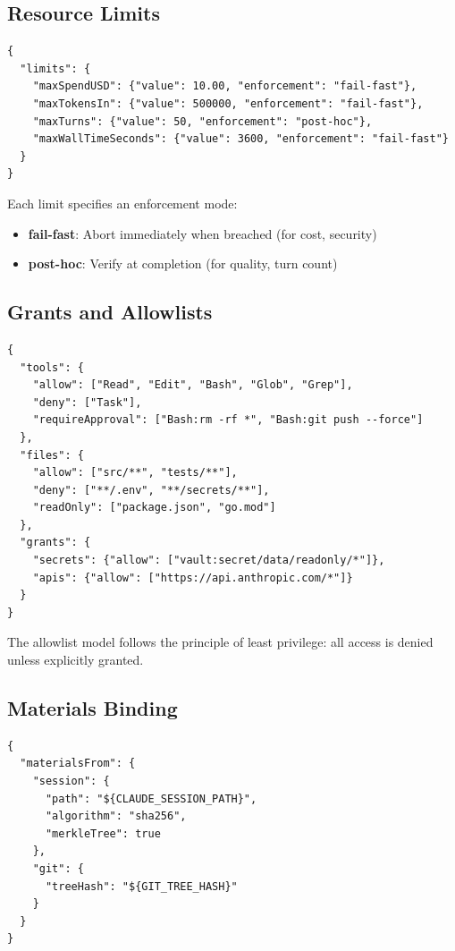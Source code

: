 \documentclass[11pt,a4paper]{article}
\begin{document}
\subsection{Resource Limits}

\begin{lstlisting}[style=json]
{
  "limits": {
    "maxSpendUSD": {"value": 10.00, "enforcement": "fail-fast"},
    "maxTokensIn": {"value": 500000, "enforcement": "fail-fast"},
    "maxTurns": {"value": 50, "enforcement": "post-hoc"},
    "maxWallTimeSeconds": {"value": 3600, "enforcement": "fail-fast"}
  }
}
\end{lstlisting}

Each limit specifies an enforcement mode:
\begin{itemize}[noitemsep]
    \item \textbf{fail-fast}: Abort immediately when breached (for cost, security)
    \item \textbf{post-hoc}: Verify at completion (for quality, turn count)
\end{itemize}

\subsection{Grants and Allowlists}

\begin{lstlisting}[style=json]
{
  "tools": {
    "allow": ["Read", "Edit", "Bash", "Glob", "Grep"],
    "deny": ["Task"],
    "requireApproval": ["Bash:rm -rf *", "Bash:git push --force"]
  },
  "files": {
    "allow": ["src/**", "tests/**"],
    "deny": ["**/.env", "**/secrets/**"],
    "readOnly": ["package.json", "go.mod"]
  },
  "grants": {
    "secrets": {"allow": ["vault:secret/data/readonly/*"]},
    "apis": {"allow": ["https://api.anthropic.com/*"]}
  }
}
\end{lstlisting}

The allowlist model follows the principle of least privilege: all access is denied unless explicitly granted.

\subsection{Materials Binding}

\begin{lstlisting}[style=json]
{
  "materialsFrom": {
    "session": {
      "path": "${CLAUDE_SESSION_PATH}",
      "algorithm": "sha256",
      "merkleTree": true
    },
    "git": {
      "treeHash": "${GIT_TREE_HASH}"
    }
  }
}
\end{lstlisting}
\end{document}
